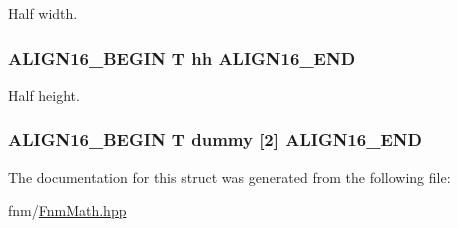 Half width. 

\hypertarget{structfnm_1_1element__t_a089b2ab5959eb8478e45d4ab106327ef}{
\subsubsection[{A\+L\+I\+G\+N16\+\_\+\+E\+N\+D}]{\setlength{\rightskip}{0pt plus 5cm}A\+L\+I\+G\+N16\+\_\+\+B\+E\+G\+I\+N T hh A\+L\+I\+G\+N16\+\_\+\+E\+N\+D}}\label{structfnm_1_1element__t_a089b2ab5959eb8478e45d4ab106327ef}


Half height. 

\hypertarget{structfnm_1_1element__t_a1452d7d19d990f8a131fb5b8b613d188}{
\subsubsection[{A\+L\+I\+G\+N16\+\_\+\+E\+N\+D}]{\setlength{\rightskip}{0pt plus 5cm}A\+L\+I\+G\+N16\+\_\+\+B\+E\+G\+I\+N T dummy \mbox{[}2\mbox{]} A\+L\+I\+G\+N16\+\_\+\+E\+N\+D}}\label{structfnm_1_1element__t_a1452d7d19d990f8a131fb5b8b613d188}


The documentation for this struct was generated from the following file\+:\begin{DoxyCompactItemize}
\item 
fnm/\hyperlink{FnmMath_8hpp}{Fnm\+Math.\+hpp}\end{DoxyCompactItemize}
